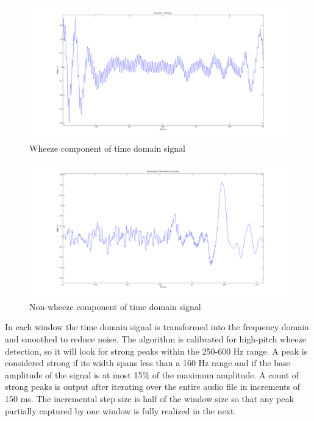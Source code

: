 \documentclass{article}
\begin{document}
\begin{figure}[H]
	\includegraphics[width=\linewidth]{images/WheezePeriodicity.png}
	\caption{Wheeze component of time domain signal}
 	\label{fig:WheezePeriodicity}
\end{figure}
\begin{figure}[H]
	\includegraphics[width=\linewidth]{images/WheezeRandomness.png}
	\caption{Non-wheeze component of time domain signal}
 	\label{fig:WheezeRandomness}
\end{figure}

In each window the time domain signal is transformed into the frequency domain and smoothed to reduce noise. The algorithm is calibrated for high-pitch wheeze detection, so it will look for strong peaks within the 250-600 Hz range. A peak is considered strong if its width spans less than a 160 Hz range and if the base amplitude of the signal is at most 15\% of the maximum amplitude. A count of strong peaks is output after iterating over the entire audio file in increments of 150 ms. The incremental step size is half of the window size so that any peak partially captured by one window is fully realized in the next.\\
\end{document}
